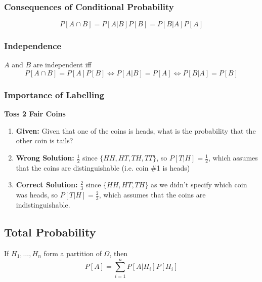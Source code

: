 \subsubsection{Consequences of Conditional Probability}
\begin{definition}
    \begin{equation}
        P[A \cap B] = P[A|B]P[B] = P[B|A]P[A]
    \end{equation}
\end{definition}

\subsubsection{Independence}
\begin{definition}
    $A$ and $B$ are independent iff 
    \begin{equation}
        P[A \cap B] = P[A]P[B] \iff P[A|B] = P[A] \iff P[B|A] = P[B]
    \end{equation}
\end{definition}

\subsubsection{Importance of Labelling}
\begin{example} \textbf{Toss 2 Fair Coins}
    \begin{enumerate}
        \item \textbf{Given:} Given that one of the coins is heads, what is the probability that the other coin is tails?
        \item \textbf{Wrong Solution:} $\frac{1}{2}$ since $\{HH, HT, TH, TT\}$, so $P[T|H] = \frac{1}{2}$, which assumes that the coins are distinguishable (i.e. coin \#1 is heads)
        \item \textbf{Correct Solution:} $\frac{2}{3}$ since $\{HH, HT, TH\}$ as we didn't specify which coin was heads, so $P[T|H] = \frac{2}{3}$, which assumes that the coins are indistinguishable.
    \end{enumerate}
    
\end{example}

\subsection{Total Probability}
\begin{definition}
    If $H_1,\ldots,H_n$ form a partition of $\Omega$, then
    \begin{equation}
        P[A] = \sum_{i=1}^{n} P[A|H_i]P[H_i]
    \end{equation}
\end{definition}

